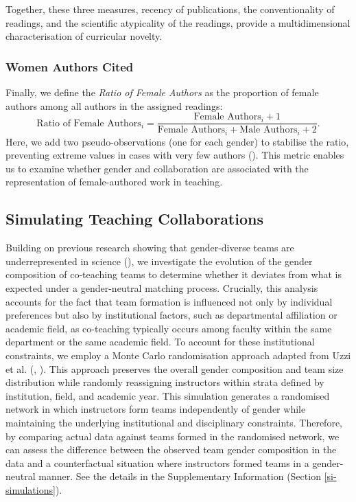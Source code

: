 \documentclass[
  british,
  11pt,
]{article}
\begin{document}
Together, these three measures, recency of publications, the conventionality of readings, and the scientific atypicality of the readings, provide a multidimensional characterisation of curricular novelty.

\subsubsection{Women Authors Cited}\label{women-authors-cited}

Finally, we define the \emph{Ratio of Female Authors} as the proportion of female authors among all authors in the assigned readings:
\[
  \text{Ratio of Female Authors}_i = \frac{\text{Female Authors}_i + 1} {\text{Female Authors}_i + \text{Male Authors}_i + 2}.
\]
Here, we add two pseudo-observations (one for each gender) to stabilise the ratio, preventing extreme values in cases with very few authors (). This metric enables us to examine whether gender and collaboration are associated with the representation of female-authored work in teaching.

\subsection{Simulating Teaching Collaborations}\label{simulating-teaching-collaborations}

Building on previous research showing that gender-diverse teams are underrepresented in science (), we investigate the evolution of the gender composition of co-teaching teams to determine whether it deviates from what is expected under a gender-neutral matching process. Crucially, this analysis accounts for the fact that team formation is influenced not only by individual preferences but also by institutional factors, such as departmental affiliation or academic field, as co-teaching typically occurs among faculty within the same department or the same academic field. To account for these institutional constraints, we employ a Monte Carlo randomisation approach adapted from Uzzi et al. (, ). This approach preserves the overall gender composition and team size distribution while randomly reassigning instructors within strata defined by institution, field, and academic year. This simulation generates a randomised network in which instructors form teams independently of gender while maintaining the underlying institutional and disciplinary constraints. Therefore, by comparing actual data against teams formed in the randomised network, we can assess the difference between the observed team gender composition in the data and a counterfactual situation where instructors formed teams in a gender-neutral manner. See the details in the Supplementary Information (Section \ref{si-simulations}).
\end{document}
